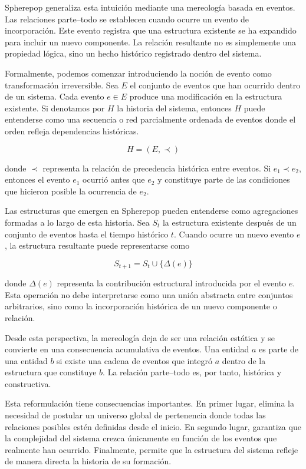 \documentclass[12pt]{article}
\begin{document}
Spherepop generaliza esta intuición mediante una mereología basada en eventos. Las relaciones parte--todo se establecen cuando ocurre un evento de incorporación. Este evento registra que una estructura existente se ha expandido para incluir un nuevo componente. La relación resultante no es simplemente una propiedad lógica, sino un hecho histórico registrado dentro del sistema.

Formalmente, podemos comenzar introduciendo la noción de evento como transformación irreversible. Sea \(E\) el conjunto de eventos que han ocurrido dentro de un sistema. Cada evento \(e \in E\) produce una modificación en la estructura existente. Si denotamos por \(H\) la historia del sistema, entonces \(H\) puede entenderse como una secuencia o red parcialmente ordenada de eventos donde el orden refleja dependencias históricas.

\[
H = (E, \prec)
\]

donde \( \prec \) representa la relación de precedencia histórica entre eventos. Si \(e_1 \prec e_2\), entonces el evento \(e_1\) ocurrió antes que \(e_2\) y constituye parte de las condiciones que hicieron posible la ocurrencia de \(e_2\).

Las estructuras que emergen en Spherepop pueden entenderse como agregaciones formadas a lo largo de esta historia. Sea \(S_t\) la estructura existente después de un conjunto de eventos hasta el tiempo histórico \(t\). Cuando ocurre un nuevo evento \(e\), la estructura resultante puede representarse como

\[
S_{t+1} = S_t \cup \{ \Delta(e) \}
\]

donde \(\Delta(e)\) representa la contribución estructural introducida por el evento \(e\). Esta operación no debe interpretarse como una unión abstracta entre conjuntos arbitrarios, sino como la incorporación histórica de un nuevo componente o relación.

Desde esta perspectiva, la mereología deja de ser una relación estática y se convierte en una consecuencia acumulativa de eventos. Una entidad \(a\) es parte de una entidad \(b\) si existe una cadena de eventos que integró \(a\) dentro de la estructura que constituye \(b\). La relación parte--todo es, por tanto, histórica y constructiva.

Esta reformulación tiene consecuencias importantes. En primer lugar, elimina la necesidad de postular un universo global de pertenencia donde todas las relaciones posibles estén definidas desde el inicio. En segundo lugar, garantiza que la complejidad del sistema crezca únicamente en función de los eventos que realmente han ocurrido. Finalmente, permite que la estructura del sistema refleje de manera directa la historia de su formación.
\end{document}
